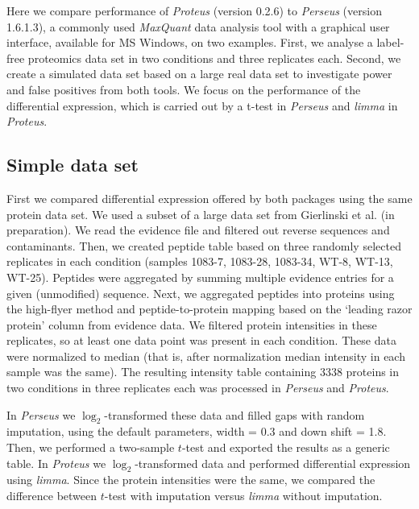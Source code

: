 \documentclass[]{article}
\begin{document}
Here we compare performance of \emph{Proteus} (version 0.2.6) to
\emph{Perseus} (version 1.6.1.3), a commonly used \emph{MaxQuant} data
analysis tool with a graphical user interface, available for MS Windows,
on two examples. First, we analyse a label-free proteomics data set in
two conditions and three replicates each. Second, we create a simulated
data set based on a large real data set to investigate power and false
positives from both tools. We focus on the performance of the
differential expression, which is carried out by a t-test in
\emph{Perseus} and \emph{limma} in \emph{Proteus}.

\subsection{Simple data set}\label{simple-data-set}

First we compared differential expression offered by both packages using
the same protein data set. We used a subset of a large data set from
Gierlinski et al. (in preparation). We read the evidence file and
filtered out reverse sequences and contaminants. Then, we created
peptide table based on three randomly selected replicates in each
condition (samples 1083-7, 1083-28, 1083-34, WT-8, WT-13, WT-25).
Peptides were aggregated by summing multiple evidence entries for a
given (unmodified) sequence. Next, we aggregated peptides into proteins
using the high-flyer method and peptide-to-protein mapping based on the
`leading razor protein' column from evidence data. We filtered protein
intensities in these replicates, so at least one data point was present
in each condition. These data were normalized to median (that is, after
normalization median intensity in each sample was the same). The
resulting intensity table containing 3338 proteins in two conditions in
three replicates each was processed in \emph{Perseus} and
\emph{Proteus}.

In \emph{Perseus} we \(\log_2\)-transformed these data and filled gaps
with random imputation, using the default parameters, width = 0.3 and
down shift = 1.8. Then, we performed a two-sample \(t\)-test and
exported the results as a generic table. In \emph{Proteus} we
\(\log_2\)-transformed data and performed differential expression using
\emph{limma}. Since the protein intensities were the same, we compared
the difference between \(t\)-test with imputation versus \emph{limma}
without imputation.
\end{document}
